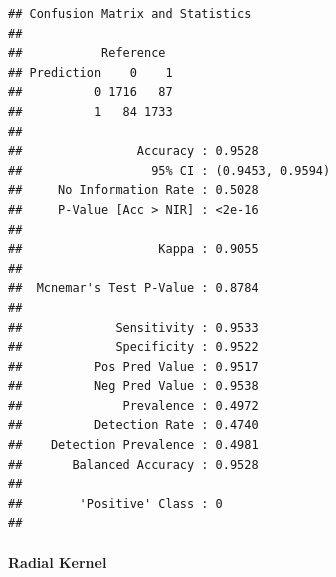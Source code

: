 \documentclass[
]{article}
\newenvironment{Shaded}{\begin{snugshade}}{\end{snugshade}}
\newcommand{\AttributeTok}[1]{\textcolor[rgb]{0.77,0.63,0.00}{#1}}
\newcommand{\DecValTok}[1]{\textcolor[rgb]{0.00,0.00,0.81}{#1}}
\newcommand{\FloatTok}[1]{\textcolor[rgb]{0.00,0.00,0.81}{#1}}
\newcommand{\FunctionTok}[1]{\textcolor[rgb]{0.00,0.00,0.00}{#1}}
\newcommand{\NormalTok}[1]{#1}
\newcommand{\OtherTok}[1]{\textcolor[rgb]{0.56,0.35,0.01}{#1}}
\newcommand{\SpecialCharTok}[1]{\textcolor[rgb]{0.00,0.00,0.00}{#1}}
\begin{document}
\begin{Shaded}
\end{Shaded}

\begin{verbatim}
## Confusion Matrix and Statistics
## 
##           Reference
## Prediction    0    1
##          0 1716   87
##          1   84 1733
##                                           
##                Accuracy : 0.9528          
##                  95% CI : (0.9453, 0.9594)
##     No Information Rate : 0.5028          
##     P-Value [Acc > NIR] : <2e-16          
##                                           
##                   Kappa : 0.9055          
##                                           
##  Mcnemar's Test P-Value : 0.8784          
##                                           
##             Sensitivity : 0.9533          
##             Specificity : 0.9522          
##          Pos Pred Value : 0.9517          
##          Neg Pred Value : 0.9538          
##              Prevalence : 0.4972          
##          Detection Rate : 0.4740          
##    Detection Prevalence : 0.4981          
##       Balanced Accuracy : 0.9528          
##                                           
##        'Positive' Class : 0               
## 
\end{verbatim}

\hypertarget{radial-kernel}{%
\paragraph{Radial Kernel}\label{radial-kernel}}
\end{document}
